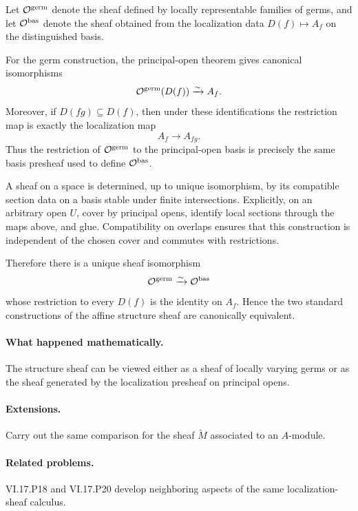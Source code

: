\begin{solution}
Let $\mathcal O^{\mathrm{germ}}$ denote the sheaf defined by locally representable families of germs, and let $\mathcal O^{\mathrm{bas}}$ denote the sheaf obtained from the localization data $D(f)\mapsto A_f$ on the distinguished basis.

For the germ construction, the principal-open theorem gives canonical isomorphisms
\[
\mathcal O^{\mathrm{germ}}(D(f))\xrightarrow{\sim}A_f.
\]
Moreover, if $D(fg)\subseteq D(f)$, then under these identifications the restriction map is exactly the localization map
\[
A_f\longrightarrow A_{fg}.
\]
Thus the restriction of $\mathcal O^{\mathrm{germ}}$ to the principal-open basis is precisely the same basis presheaf used to define $\mathcal O^{\mathrm{bas}}$.

A sheaf on a space is determined, up to unique isomorphism, by its compatible section data on a basis stable under finite intersections.  Explicitly, on an arbitrary open $U$, cover by principal opens, identify local sections through the maps above, and glue.  Compatibility on overlaps ensures that this construction is independent of the chosen cover and commutes with restrictions.

Therefore there is a unique sheaf isomorphism
\[
\mathcal O^{\mathrm{germ}}\xrightarrow{\sim}\mathcal O^{\mathrm{bas}}
\]
whose restriction to every $D(f)$ is the identity on $A_f$.  Hence the two standard constructions of the affine structure sheaf are canonically equivalent.
\end{solution}



\paragraph{What happened mathematically.}
The structure sheaf can be viewed either as a sheaf of locally varying germs or as the sheaf generated by the localization presheaf on principal opens.

\paragraph{Extensions.}
Carry out the same comparison for the sheaf $\widetilde M$ associated to an $A$-module.

\paragraph{Related problems.}
VI.17.P18 and VI.17.P20 develop neighboring aspects of the same localization-sheaf calculus.
\fi
